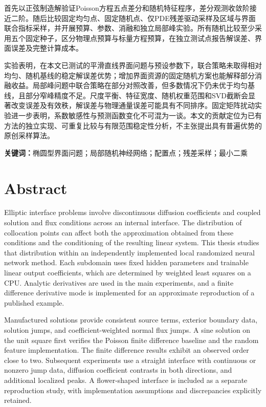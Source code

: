 \documentclass[UTF8,12pt,oneside]{ctexbook}
\theoremstyle{definition}
\begin{document}
首先以正弦制造解验证Poisson方程五点差分和随机特征程序，差分观测收敛阶接近二阶。随后比较固定均匀点、固定随机点、仅PDE残差驱动采样及区域与界面联合指标采样，并开展预算、参数、消融和独立局部峰实验。所有随机比较至少采用五个固定种子，区分物理点预算与标量方程预算，在独立测试点报告解误差、界面误差及完整计算成本。

实验表明，在本文已测试的平滑直线界面问题与预设参数下，联合策略未取得相对均匀、随机基线的稳定解误差优势；增加界面资源的固定随机方案也能解释部分消融收益。局部峰问题中联合策略在部分对照改善，但多数情况下仍未优于均匀基线，且部分窄峰精度不足。尺度平衡、特征宽度、随机权重范围和SVD截断会显著改变误差及有效秩，解误差与物理通量误差可能具有不同排序。固定矩阵扰动实验进一步表明，系数敏感性与预测函数变化不可混为一谈。本文的贡献定位为已有方法的独立实现、可重复比较与有限范围稳定性分析，不主张提出具有普遍优势的原创采样算法。

\noindent\textbf{关键词：}椭圆型界面问题；局部随机神经网络；配置点；残差采样；最小二乘
\chapter*{Abstract}
Elliptic interface problems involve discontinuous diffusion coefficients and coupled solution and flux conditions across an internal interface. The distribution of collocation points can affect both the approximation obtained from these conditions and the conditioning of the resulting linear system. This thesis studies that distribution within an independently implemented local randomized neural network method. Each subdomain uses fixed hidden parameters and trainable linear output coefficients, which are determined by weighted least squares on a CPU. Analytic derivatives are used in the main experiments, and a finite difference derivative mode is implemented for an approximate reproduction of a published example.

Manufactured solutions provide consistent source terms, exterior boundary data, solution jumps, and coefficient-weighted normal flux jumps. A sine solution on the unit square first verifies the Poisson finite difference baseline and the random feature implementation. The finite difference results exhibit an observed order close to two. Subsequent experiments use a straight interface with continuous or nonzero jump data, diffusion coefficient contrasts in both directions, and additional localized peaks. A flower-shaped interface is included as a separate reproduction study, with implementation assumptions and discrepancies explicitly retained.
\end{document}
